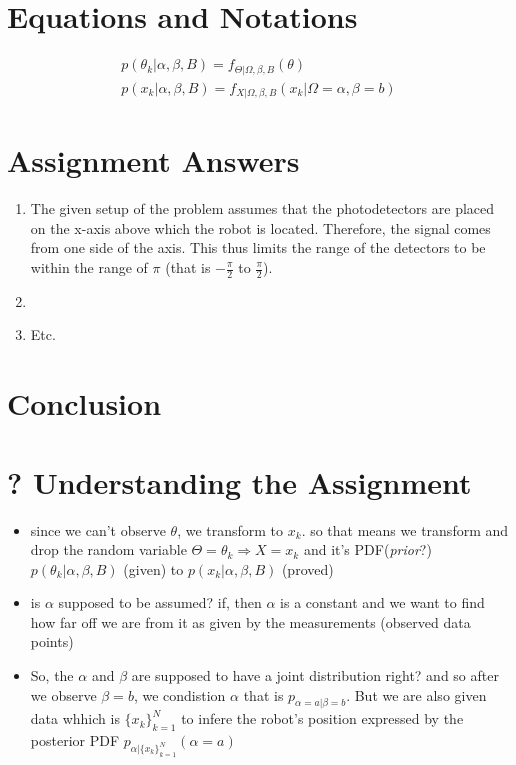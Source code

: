 \documentclass[a4paper,11pt]{article}
\begin{document}
\section*{Equations and Notations}
\begin{eqnarray}
	p(\theta_k | \alpha, \beta, B) = f_{\Theta | \Omega, \beta, B}(\theta)\\
	p(x_k |\alpha, \beta, B) = f_{X | \Omega, \beta, B}(x_k | \Omega = \alpha, \beta = b )
\end{eqnarray}

\section*{Assignment Answers}
\begin{enumerate}
  \item The given setup of the problem assumes that the photodetectors are placed on the x-axis above which the robot is located. Therefore, the signal comes from one side of the axis. This thus limits the range of the detectors to be within the range of $\pi$ (that is $-\frac{\pi}{2}$ to $\frac{\pi}{2}$). 
  \item 
  \item Etc.
\end{enumerate}

\section*{Conclusion}

\newpage
\appendix

\section{? Understanding the Assignment}
\begin{itemize}
	\item since we can't observe $\theta$, we transform to $x_k$. so that means we transform and drop the random variable $\Theta = \theta_k \Rightarrow X = x_k$  and it's PDF(\emph{prior}?) $p(\theta_k | \alpha, \beta, B)$ (given) to $p(x_k | \alpha, \beta, B)$ (proved)
	\item is $\alpha$ supposed to be assumed? if, then $\alpha$ is a constant and we want to find how far off we are from it as given by the measurements (observed data points)
	\item So, the $\alpha$ and $\beta$ are supposed to have a joint distribution right? and so after we observe $\beta = b$, we condistion $\alpha$ that is $p_{\alpha = a | \beta = b}$. But we are also given data whhich is $\{x_k\}^N _{k = 1}$ to infere the robot's position expressed by the posterior PDF $p_{\alpha | \{x_k\}^N _{k = 1}}(\alpha = a)$
\end{itemize}
\end{document}
